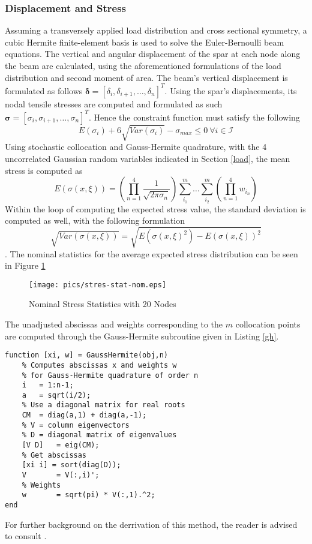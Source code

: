 \documentclass{article}
\begin{document}
\subsubsection{Displacement and Stress}
Assuming a transversely applied load distribution and cross sectional symmetry, a cubic Hermite finite-element basis is used to solve the Euler-Bernoulli beam equations. The vertical and angular displacement of the spar at each node along the beam are calculated, using the aforementioned formulations of the load distribution and second moment of area. The beam's vertical displacement is formulated as follows $ \mathbf{\delta} = [\delta_i, \delta_{i+1}, \dots, \delta_n]^T $. Using the spar's displacements, its nodal tensile stresses are computed and formulated as such
$\mathbf{\sigma} = [\sigma_i, \sigma_{i+1}, \dots, \sigma_n]^T $. Hence the constraint function must satisfy the following 
$$E(\sigma_i) + 6\sqrt{Var(\sigma_i)} - \sigma_{max} \leq 0 ~\forall i \in \mathcal{I}$$ 
Using stochastic collocation and Gauss-Hermite quadrature, with the 4 uncorrelated Gaussian random variables indicated in Section \ref{load}, the mean stress is computed as
$$
E(\sigma(x,\xi))=\left(\prod_{n=1}^4 \frac{1}{\sqrt{2\pi\sigma_n}}\right)\sum_{i_1}^m \dots \sum_{i_2}^m \left(\prod_{n=1}^4 w_{i_n}\right)
$$
Within the loop of computing the expected stress value, the standard deviation is computed as well, with the following formulation
$$
\sqrt{Var(\sigma(x,\xi))}=\sqrt{E(\sigma(x,\xi)^2)-E(\sigma(x,\xi))^2}
$$.
The nominal statistics for the average expected stress distribution can be seen in Figure \ref{fig:nomstress}
\begin{figure}
    \centering
    \texttt{[image: pics/stres-stat-nom.eps]}
    \caption{Nominal Stress Statistics with 20 Nodes}
    \label{fig:nomstress}
\end{figure}
The unadjusted abscissas and weights corresponding to the $m$ collocation points are computed through the Gauss-Hermite subroutine given in Listing \ref{gh}.
\begin{lstlisting}[label=gh,caption=Gauss-Hermite Abscissas and Weights]
function [xi, w] = GaussHermite(obj,n)
    % Computes abscissas x and weights w
    % for Gauss-Hermite quadrature of order n
    i   = 1:n-1;
    a   = sqrt(i/2);
    % Use a diagonal matrix for real roots
    CM  = diag(a,1) + diag(a,-1);
    % V = column eigenvectors
    % D = diagonal matrix of eigenvalues
    [V D]   = eig(CM);
    % Get abscissas
    [xi i] = sort(diag(D));
    V       = V(:,i)';
    % Weights
    w       = sqrt(pi) * V(:,1).^2;
end
\end{lstlisting}
For further background on the derrivation of this method, the reader is advised to consult \cite{Lazarov2012}.
\end{document}
